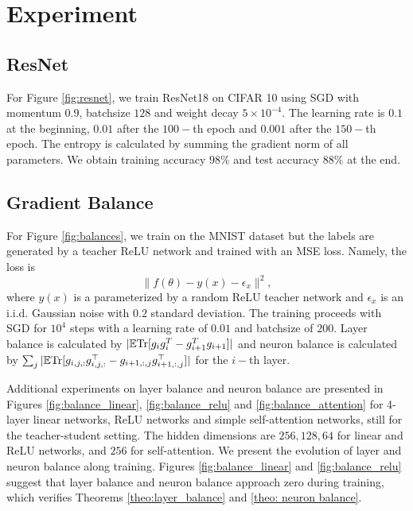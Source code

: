 \documentclass{article}
\theoremstyle{plain}
\newcommand{\E}{\mathbb{E}}
\newcommand{\Tr}{{\rm Tr}}
\begin{document}




\clearpage
\appendix

\section{Experiment}
\label{app:exp}
\subsection{ResNet}
For Figure \ref{fig:resnet}, we train ResNet18 on CIFAR 10 using SGD with momentum $0.9$, batchsize $128$ and weight decay $5\times10^{-4}$. The learning rate is $0.1$ at the beginning, $0.01$ after the $100-$th epoch and $0.001$ after the $150-$th epoch. The entropy is calculated by summing the gradient norm of all parameters. We obtain training accuracy $98\%$ and test accuracy $88\%$ at the end.

\subsection{Gradient Balance}
For Figure \ref{fig:balances}, we train on the MNIST dataset but the labels are generated by a teacher ReLU network and trained with an MSE loss. Namely, the loss is
\begin{equation}
    \|f(\theta) -y(x) - \epsilon_x\|^2,
\end{equation}
where $y(x)$ is a parameterized by a random ReLU teacher network and $\epsilon_x$ is an i.i.d. Gaussian noise with $0.2$ standard deviation. The training proceeds with SGD for $10^4$ steps with a learning rate of $0.01$ and batchsize of $200$. Layer balance is calculated by $|\E\Tr [g_ig_i^T-g_{i+1}^Tg_{i+1}]|$ and neuron balance is calculated by $\sum_j|\E\Tr[g_{i,j,:}g_{i,j,:}^\top-g_{i+1,:, j}g_{i+1,:,j}^\top]|$ for the $i-$th layer.


Additional experiments on layer balance and neuron balance are presented in Figures \ref{fig:balance_linear}, \ref{fig:balance_relu} and \ref{fig:balance_attention} for 4-layer linear networks, ReLU networks and simple self-attention networks, still for the teacher-student setting. The hidden dimensions are $256,128,64$ for linear and ReLU networks, and $256$ for self-attention. We present the evolution of layer and neuron balance along training. Figures \ref{fig:balance_linear} and \ref{fig:balance_relu} suggest that layer balance and neuron balance approach zero during training, which verifies Theorems \ref{theo:layer_balance} and \ref{theo: neuron balance}. 
\end{document}
